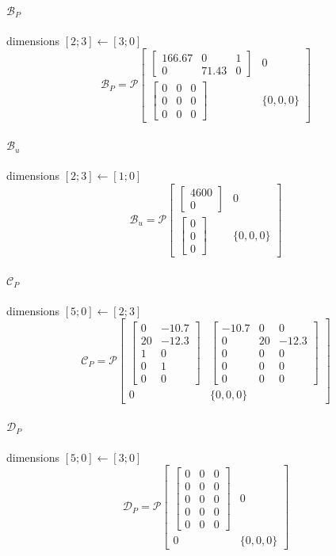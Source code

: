 \documentclass{article}
\newcommand{\PIop}[6]{\mathcal P\!\left[\begin{array}{c|c}#1&#2\\\hline#3&\{#4,#5,#6\}\end{array}\right]}
\begin{document}
\paragraph{$\mathcal B_P$}\hfill dimensions $[2;3]\leftarrow[3;0]$
\[\displaystyle \mathcal B_P=\PIop{\begin{bmatrix}166.67 & 0 & 1\\0 & 71.43 & 0\end{bmatrix}}{0}{\begin{bmatrix}0 & 0 & 0\\0 & 0 & 0\\0 & 0 & 0\end{bmatrix}}{0}{0}{0}\]
\paragraph{$\mathcal B_u$}\hfill dimensions $[2;3]\leftarrow[1;0]$
\[\displaystyle \mathcal B_u=\PIop{\begin{bmatrix}4600\\0\end{bmatrix}}{0}{\begin{bmatrix}0\\0\\0\end{bmatrix}}{0}{0}{0}\]
\paragraph{$\mathcal C_P$}\hfill dimensions $[5;0]\leftarrow[2;3]$
\[\displaystyle \mathcal C_P=\PIop{\begin{bmatrix}0 & -10.7\\20 & -12.3\\1 & 0\\0 & 1\\0 & 0\end{bmatrix}}{\begin{bmatrix}-10.7 & 0 & 0\\0 & 20 & -12.3\\0 & 0 & 0\\0 & 0 & 0\\0 & 0 & 0\end{bmatrix}}{0}{0}{0}{0}\]
\paragraph{$\mathcal D_P$}\hfill dimensions $[5;0]\leftarrow[3;0]$
\[\displaystyle \mathcal D_P=\PIop{\begin{bmatrix}0 & 0 & 0\\0 & 0 & 0\\0 & 0 & 0\\0 & 0 & 0\\0 & 0 & 0\end{bmatrix}}{0}{0}{0}{0}{0}\]
\end{document}
